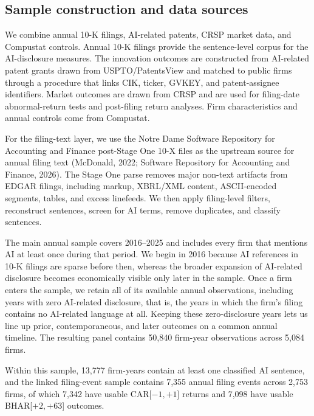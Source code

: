 \subsection{Sample construction and data sources}

We combine annual 10-K filings, AI-related patents, CRSP market data, and Compustat controls. Annual 10-K filings provide the sentence-level corpus for the AI-disclosure measures. The innovation outcomes are constructed from AI-related patent grants drawn from USPTO/PatentsView and matched to public firms through a procedure that links CIK, ticker, GVKEY, and patent-assignee identifiers. Market outcomes are drawn from CRSP and are used for filing-date abnormal-return tests and post-filing return analyses. Firm characteristics and annual controls come from Compustat.

For the filing-text layer, we use the Notre Dame Software Repository for Accounting and Finance post-Stage One 10-X files as the upstream source for annual filing text (McDonald, 2022; Software Repository for Accounting and Finance, 2026). The Stage One parse removes major non-text artifacts from EDGAR filings, including markup, XBRL/XML content, ASCII-encoded segments, tables, and excess linefeeds. We then apply filing-level filters, reconstruct sentences, screen for AI terms, remove duplicates, and classify sentences.

The main annual sample covers 2016--2025 and includes every firm that mentions AI at least once during that period. We begin in 2016 because AI references in 10-K filings are sparse before then, whereas the broader expansion of AI-related disclosure becomes economically visible only later in the sample. Once a firm enters the sample, we retain all of its available annual observations, including years with zero AI-related disclosure, that is, the years in which the firm's filing contains no AI-related language at all. Keeping these zero-disclosure years lets us line up prior, contemporaneous, and later outcomes on a common annual timeline. The resulting panel contains 50,840 firm-year observations across 5,084 firms.

Within this sample, 13,777 firm-years contain at least one classified AI sentence, and the linked filing-event sample contains 7,355 annual filing events across 2,753 firms, of which 7,342 have usable CAR[$-1,+1$] returns and 7,098 have usable BHAR[$+2,+63$] outcomes.

